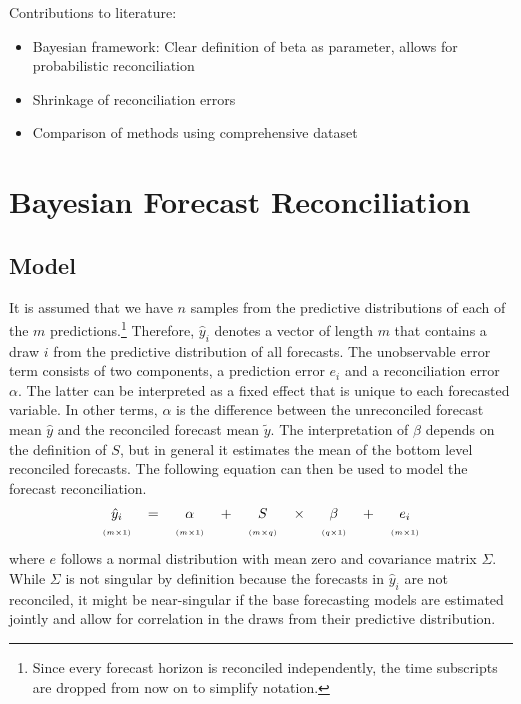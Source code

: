 \documentclass[a4paper,fleqn,11pt]{article}
\begin{document}
Contributions to literature:
\begin{itemize}
	\item Bayesian framework: Clear definition of beta as parameter, allows for probabilistic reconciliation
	\item Shrinkage of reconciliation errors
	\item Comparison of methods using comprehensive dataset
\end{itemize}

\clearpage

\section{Bayesian Forecast Reconciliation}
\subsection{Model}
It is assumed that we have $n$ samples from the predictive distributions of each of the $m$ predictions.\footnote{Since every forecast horizon is reconciled independently, the time subscripts are dropped from now on to simplify notation.} Therefore, $\hat{y}_{i}$ denotes a vector of length $m$ that contains a draw $i$ from the predictive distribution of all forecasts. The unobservable error term consists of two components, a prediction error $e_{i}$ and a reconciliation error $\alpha$. The latter can be interpreted as a fixed effect that is unique to each forecasted variable. In other terms, $\alpha$ is the difference between the unreconciled forecast mean $\hat{y}$ and the reconciled forecast mean $\tilde{y}$. The interpretation of $\beta$ depends on the definition of $S$, but in general it estimates the mean of the bottom level reconciled forecasts. The following equation can then be used to model the forecast reconciliation.
\begin{align}
\label{eq:main}
\begin{tabular}{ccccccccc}
	$\hat{y}_i$ & $=$ & $\alpha$ & + &$S$ & $\times$ & $\beta$ & $+$ & $e_i$ \\
	$\scriptscriptstyle (m\times 1)$ & & $\scriptscriptstyle (m\times 1)$  & & $ \scriptscriptstyle (m\times q) $ & & $\scriptscriptstyle (q\times 1)$ & & $\scriptscriptstyle (m\times 1)$
\end{tabular}
\end{align}
where $e$ follows a normal distribution with mean zero and covariance matrix $\Sigma$. While $\Sigma$ is not singular by definition because the forecasts in $\hat{y}_{i}$ are not reconciled, it might be near-singular if the base forecasting models are estimated jointly and allow for correlation in the draws from their predictive distribution. 
\end{document}
